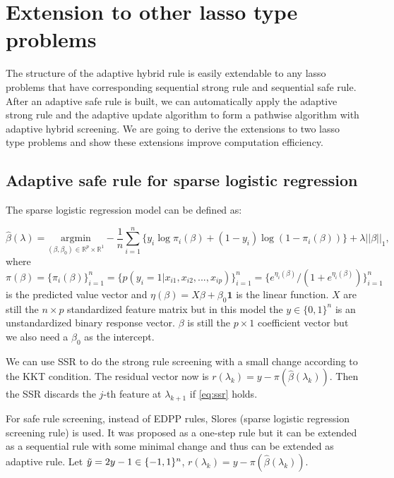 \section{Extension to other lasso type problems}
\label{sec:4}

The structure of the adaptive hybrid rule is easily extendable to any lasso problems that have corresponding sequential strong rule and sequential safe rule. After an adaptive safe rule is built, we can automatically apply the adaptive strong rule and the adaptive update algorithm to form a pathwise algorithm with adaptive hybrid screening. We are going to derive the extensions to two lasso type problems and show these extensions improve computation efficiency.

\subsection{Adaptive safe rule for sparse logistic regression}

The sparse logistic regression model can be defined as:

\begin{equation}
    \label{eq:logis}
    \hat{\beta}(\lambda)=\underset{(\beta,\beta_0)\in \mathbb{R}^p\times\mathbb{R}^1}{\mathrm{argmin}}-\frac{1}{n}\sum_{i=1}^n\{y_i\log\pi_i(\beta)+(1-y_i)\log(1-\pi_i(\beta))\}+\lambda||\beta||_1,
\end{equation}
where $\pi(\beta)=\{\pi_i(\beta)\}_{i=1}^n=\{p(y_i=1|x_{i1},x_{i2},...,x_{ip})\}_{i=1}^n=\{e^{\eta_i(\beta)}/(1+e^{\eta_i(\beta)})\}_{i=1}^n$ is the predicted value vector and $\eta(\beta)=X\beta+\beta_0\mathbf{1}$ is the linear function. $X$ are still the $n\times p$ standardized feature matrix but in this model the $y\in\{0,1\}^n$ is an unstandardized binary response vector. $\beta$ is still the $p\times1$ coefficient vector but we also need a $\beta_0$ as the intercept.

We can use SSR to do the strong rule screening with a small change according to the KKT condition. The residual vector now is $r(\lambda_k)=y-\pi(\hat{\beta}(\lambda_k))$. Then the SSR discards the $j$-th feature at $\lambda_{k+1}$ if \eqref{eq:ssr} holds.

For safe rule screening, instead of EDPP rules, Slores (sparse logistic regression screening rule)\citep{wang2014safe} is used. It was proposed as a one-step rule but it can be extended as a sequential rule with some minimal change and thus can be extended as adaptive rule. Let $\Tilde{y}=2y-1\in\{-1,1\}^n$, $r(\lambda_k)=y-\pi(\hat{\beta}(\lambda_k))$.

